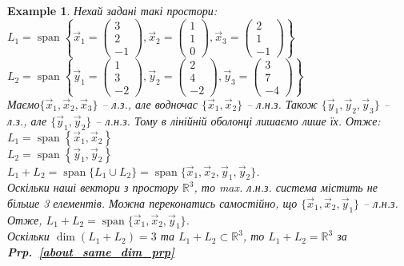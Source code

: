 \documentclass[a4paper, 10pt]{article}
\theoremstyle{theoremdd}
\newtheorem{example}[theorem]{Example}
\newcommand\prpref[1]{\textbf{Prp.~\ref{#1}}}
\DeclareMathOperator{\linspan}{span}
\begin{document}
	\begin{example}
	Нехай задані такі простори: \\ 
	$L_1 = \linspan\left\{ \vec{x}_1 = \begin{pmatrix} 3 \\ 2 \\ -1 \end{pmatrix}, \vec{x}_2 = \begin{pmatrix} 1 \\ 1 \\ 0 \end{pmatrix}, \vec{x}_3 = \begin{pmatrix} 2 \\ 1 \\ -1 \end{pmatrix}	 \right\}$\\
	$L_2 = \linspan\left\{ \vec{y}_1 = \begin{pmatrix} 1 \\ 3 \\ -2 \end{pmatrix}, \vec{y}_2 = \begin{pmatrix} 2 \\ 4 \\ -2 \end{pmatrix}, \vec{y}_3 = \begin{pmatrix} 3 \\ 7 \\ -4 \end{pmatrix}	 \right\}$\\
	Маємо$\{\vec{x}_1, \vec{x}_2, \vec{x}_3\}$ -- л.з., але водночас $\{\vec{x}_1,\vec{x}_2\}$ -- л.н.з. Також $\{\vec{y}_1,\vec{y}_2,\vec{y}_3\}$ -- л.з., але $\{\vec{y}_1,\vec{y}_2\}$ -- л.н.з. Тому в лінійній оболонці лишаємо лише їх. Отже: \\
	$L_1 = \linspan\left\{ \vec{x}_1, \vec{x}_2 \right\}$\\
	$L_2 = \linspan\left\{ \vec{y}_1, \vec{y}_2 \right\}$
	\bigskip \\
	$L_1 + L_2 = \linspan\{L_1 \cup L_2\} = \linspan\{\vec{x}_1, \vec{x}_2, \vec{y}_1, \vec{y}_2\}$.\\
	Оскільки наші вектори з простору $\mathbb{R}^3$, то max. л.н.з. система містить не більше 3 елементів. Можна переконатись самостійно, що $\{\vec{x}_1, \vec{x}_2, \vec{y}_1\}$ -- л.н.з. Отже, $L_1 + L_2 = \linspan\{\vec{x}_1, \vec{x}_2, \vec{y}_1 \}$.\\
	Оскільки $\dim (L_1 + L_2) = 3$ та $L_1 + L_2 \subset \mathbb{R}^3$, то $L_1+L_2= \mathbb{R}^3$ за \prpref{about_same_dim_prp}

\end{example}
\end{document}
